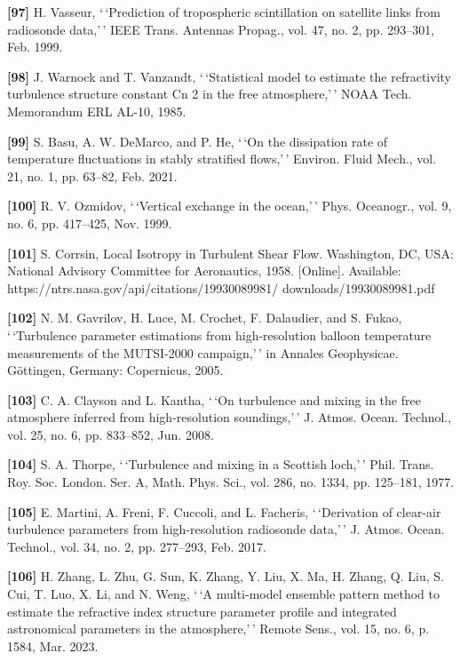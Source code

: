 \documentclass[
]{article}
\begin{document}
\textbf{{[}97{]}} H. Vasseur, `\,`Prediction of tropospheric
scintillation on satellite links from radiosonde data,'\,' IEEE Trans.
Antennas Propag., vol. 47, no. 2, pp. 293--301, Feb. 1999.

\textbf{{[}98{]}} J. Warnock and T. Vanzandt, `\,`Statistical model to
estimate the refractivity turbulence structure constant Cn 2 in the free
atmosphere,'\,' NOAA Tech. Memorandum ERL AL-10, 1985.

\textbf{{[}99{]}} S. Basu, A. W. DeMarco, and P. He, `\,`On the
dissipation rate of temperature fluctuations in stably stratified
flows,'\,' Environ. Fluid Mech., vol. 21, no. 1, pp. 63--82, Feb. 2021.

\textbf{{[}100{]}} R. V. Ozmidov, `\,`Vertical exchange in the
ocean,'\,' Phys. Oceanogr., vol. 9, no. 6, pp. 417--425, Nov. 1999.

\textbf{{[}101{]}} S. Corrsin, Local Isotropy in Turbulent Shear Flow.
Washington, DC, USA: National Advisory Committee for Aeronautics, 1958.
{[}Online{]}. Available:
https://ntrs.nasa.gov/api/citations/19930089981/
downloads/19930089981.pdf

\textbf{{[}102{]}} N. M. Gavrilov, H. Luce, M. Crochet, F. Dalaudier,
and S. Fukao, `\,`Turbulence parameter estimations from high-resolution
balloon temperature measurements of the MUTSI-2000 campaign,'\,' in
Annales Geophysicae. Göttingen, Germany: Copernicus, 2005.

\textbf{{[}103{]}} C. A. Clayson and L. Kantha, `\,`On turbulence and
mixing in the free atmosphere inferred from high-resolution
soundings,'\,' J. Atmos. Ocean. Technol., vol. 25, no. 6, pp. 833--852,
Jun. 2008.

\textbf{{[}104{]}} S. A. Thorpe, `\,`Turbulence and mixing in a Scottish
loch,'\,' Phil. Trans. Roy. Soc. London. Ser. A, Math. Phys. Sci., vol.
286, no. 1334, pp. 125--181, 1977.

\textbf{{[}105{]}} E. Martini, A. Freni, F. Cuccoli, and L. Facheris,
`\,`Derivation of clear-air turbulence parameters from high-resolution
radiosonde data,'\,' J. Atmos. Ocean. Technol., vol. 34, no. 2, pp.
277--293, Feb. 2017.

\textbf{{[}106{]}} H. Zhang, L. Zhu, G. Sun, K. Zhang, Y. Liu, X. Ma, H.
Zhang, Q. Liu, S. Cui, T. Luo, X. Li, and N. Weng, `\,`A multi-model
ensemble pattern method to estimate the refractive index structure
parameter profile and integrated astronomical parameters in the
atmosphere,'\,' Remote Sens., vol. 15, no. 6, p. 1584, Mar. 2023.
\end{document}

